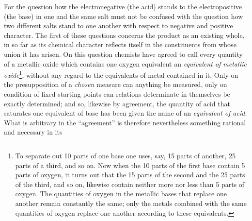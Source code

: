 \documentclass[12pt,a4paper]{book}
\begin{document}
For the question how the electronegative (the acid) stands to the
electropositive (the base) in one and the same salt must not be confused with
the question how two different salts stand to one another with respect to
negative and positive character. The first of these questions concerns the
product as an existing whole, in so far as its chemical character reflects
itself in the constituents from whose union it has arisen. On this question
chemists have agreed to call every quantity of a metallic oxide which contains
one oxygen equivalent an \emph{equivalent of metallic oxide}\footnote{To
separate out 10 parts of one base one uses, say, 15 parts of another, 25 parts
of a third, and so on. Now when the 10 parts of the first base contain 5 parts
of oxygen, it turns out that the 15 parts of the second and the 25 parts of the
third, and so on, likewise contain neither more nor less than 5 parts of
oxygen. The quantities of oxygen in the metallic bases that replace one another
remain constantly the same; only the metals combined with the same quantities
of oxygen replace one another according to these equivalents.}, without any
regard to the equivalents of metal contained in it. Only on the presupposition
of a \emph{chosen} measure can anything be measured, only on condition of fixed
starting points can
\setcounter{footnote}{0}
relations determinate in themselves be exactly determined; and so, likewise by
agreement, the quantity of acid that saturates one equivalent of base has been
given the name of an \emph{equivalent of acid}. What is arbitrary in the
``agreement'' is therefore nevertheless something rational and necessary in its
\end{document}
